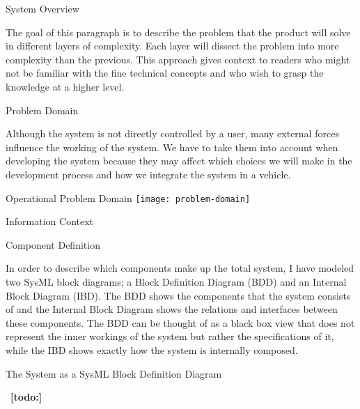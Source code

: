 \documentclass{matthijs}
\begin{document}
	\begin{hoofdstuk}{System Overview}

		The goal of this paragraph is to describe the problem that the product will solve in different layers of complexity.
		Each layer will dissect the problem into more complexity than the previous.
		This approach gives context to readers who might not be familiar with the fine technical concepts and who wish to grasp the knowledge at a higher level.

		\begin{paragraaf}{Problem Domain}

			Although the system is not directly controlled by a user, many external forces influence the working of the system.
			We have to take them into account when developing the system because they may affect which choices we will make in the development process and how we integrate the system in a vehicle.

			\begin{figuur}{Operational Problem Domain}
				\singlespacing
				\texttt{[image: problem-domain]}
				\onehalfspacing
			\end{figuur}

		\end{paragraaf}

		\begin{paragraaf}{Information Context}

		\end{paragraaf}

		\begin{paragraaf}{Component Definition}

			In order to describe which components make up the total system, I have modeled two SysML block diagrams; a Block Definition Diagram (BDD) and an Internal Block Diagram (IBD).
			The BDD shows the components that the system consists of and the Internal Block Diagram shows the relations and interfaces between these components.
			The BDD can be thought of as a black box view that does not represent the inner workings of the system but rather the specifications of it, while the IBD shows exactly how the system is internally composed.

			\begin{figuur}{The System as a SysML Block Definition Diagram}
				\singlespacing
				\onehalfspacing
			\end{figuur}

		\end{paragraaf}

		\
		\textbf{[todo:]}

	\end{hoofdstuk}
\end{document}
